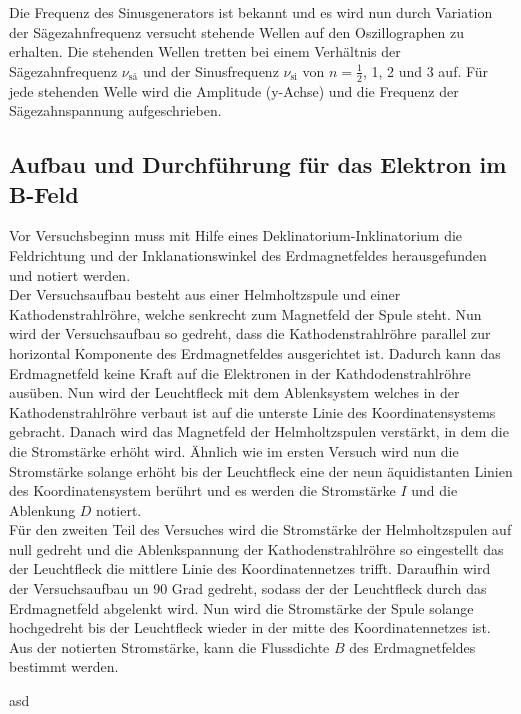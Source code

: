 Die Frequenz des Sinusgenerators ist bekannt und es wird nun durch Variation der Sägezahnfrequenz versucht stehende Wellen auf den Oszillographen zu erhalten. Die stehenden Wellen tretten bei einem Verhältnis der Sägezahnfrequenz $\nu_\text{sä}$ und der Sinusfrequenz $\nu_\text{si}$ von $n = \frac{1}{2}$, 1, 2 und 3 auf. Für jede stehenden Welle wird die Amplitude (y-Achse) und die Frequenz der Sägezahnspannung aufgeschrieben.

\subsection{Aufbau und Durchführung für das Elektron im B-Feld}
Vor Versuchsbeginn muss mit Hilfe eines Deklinatorium-Inklinatorium die Feldrichtung und der Inklanationswinkel des Erdmagnetfeldes herausgefunden und notiert werden. \\
Der Versuchsaufbau besteht aus einer Helmholtzspule und einer Kathodenstrahlröhre, welche senkrecht zum Magnetfeld der Spule steht. Nun wird der Versuchsaufbau so gedreht, dass die Kathodenstrahlröhre parallel zur horizontal Komponente des Erdmagnetfeldes ausgerichtet ist. Dadurch kann das Erdmagnetfeld keine Kraft auf die Elektronen in der Kathdodenstrahlröhre ausüben. Nun wird der Leuchtfleck mit dem Ablenksystem welches in der Kathodenstrahlröhre verbaut ist auf die unterste Linie des Koordinatensystems gebracht. Danach wird das Magnetfeld der Helmholtzspulen verstärkt, in dem die die Stromstärke erhöht wird. Ähnlich wie im ersten Versuch wird nun die Stromstärke solange erhöht bis der Leuchtfleck eine der neun äquidistanten Linien des Koordinatensystem berührt und es werden die Stromstärke $I$ und die Ablenkung $D$ notiert. \\
Für den zweiten Teil des Versuches wird die Stromstärke der Helmholtzspulen auf null gedreht und die Ablenkspannung der Kathodenstrahlröhre so eingestellt das der Leuchtfleck die mittlere Linie des Koordinatennetzes trifft. Daraufhin wird der Versuchsaufbau un 90 Grad gedreht, sodass der der Leuchtfleck durch das Erdmagnetfeld abgelenkt wird. Nun wird die Stromstärke der Spule solange hochgedreht bis der Leuchtfleck wieder in der mitte des Koordinatennetzes ist. Aus der notierten Stromstärke, kann die Flussdichte $B$ des Erdmagnetfeldes bestimmt werden.  




























asd
